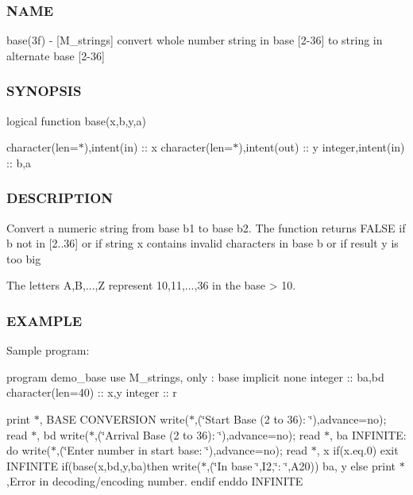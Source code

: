 \subsubsection*{N\+A\+ME}

base(3f) -\/ \mbox{[}M\+\_\+strings\mbox{]} convert whole number string in base \mbox{[}2-\/36\mbox{]} to string in alternate base \mbox{[}2-\/36\mbox{]}

\subsubsection*{S\+Y\+N\+O\+P\+S\+IS}

logical function base(x,b,y,a)

character(len=$\ast$),intent(in) \+:\+: x character(len=$\ast$),intent(out) \+:\+: y integer,intent(in) \+:\+: b,a

\subsubsection*{D\+E\+S\+C\+R\+I\+P\+T\+I\+ON}

\begin{DoxyVerb}Convert a numeric string from base b1 to base b2. The function returns
FALSE if b not in [2..36] or if string x contains invalid
characters in base b or if result y is too big

The letters A,B,...,Z represent 10,11,...,36 in the base > 10.
\end{DoxyVerb}


\subsubsection*{E\+X\+A\+M\+P\+LE}

Sample program\+:

program demo\+\_\+base use M\+\_\+strings, only \+: base implicit none integer \+:\+: ba,bd character(len=40) \+:\+: x,y integer \+:\+: r

print $\ast$,\textquotesingle{} B\+A\+SE C\+O\+N\+V\+E\+R\+S\+I\+ON\textquotesingle{} write($\ast$,\textquotesingle{}(\char`\"{}\+Start   Base (2 to 36)\+: \char`\"{})\textquotesingle{},advance=\textquotesingle{}no\textquotesingle{}); read $\ast$, bd write($\ast$,\textquotesingle{}(\char`\"{}\+Arrival Base (2 to 36)\+: \char`\"{})\textquotesingle{},advance=\textquotesingle{}no\textquotesingle{}); read $\ast$, ba I\+N\+F\+I\+N\+I\+TE\+: do write($\ast$,\textquotesingle{}(\char`\"{}\+Enter number in start base\+: \char`\"{})\textquotesingle{},advance=\textquotesingle{}no\textquotesingle{}); read $\ast$, x if(x.\+eq.\textquotesingle{}0\textquotesingle{}) exit I\+N\+F\+I\+N\+I\+TE if(base(x,bd,y,ba)then write($\ast$,\textquotesingle{}(\char`\"{}\+In base \char`\"{},I2,\char`\"{}\+: \char`\"{},A20)\textquotesingle{}) ba, y else print $\ast$,\textquotesingle{}Error in decoding/encoding number.\textquotesingle{} endif enddo I\+N\+F\+I\+N\+I\+TE

